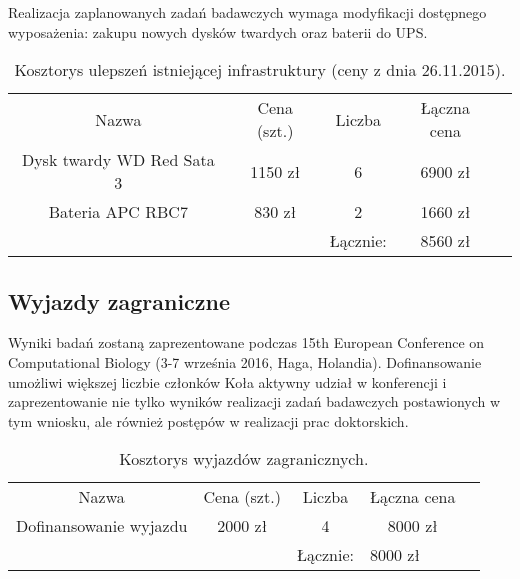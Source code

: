\documentclass{article}
\begin{document}
Realizacja zaplanowanych zadań badawczych wymaga modyfikacji dostępnego wyposażenia: zakupu nowych dysków twardych oraz baterii do UPS.

\begin{table}[!htbp]
\centering
\caption*{Kosztorys ulepszeń istniejącej infrastruktury (ceny z dnia 26.11.2015).}
\begin{tabular}{ccccc}
\cline{1-4}
\multicolumn{1}{|c|}{Nazwa}                     & \multicolumn{1}{c|}{Cena (szt.)} & \multicolumn{1}{c|}{Liczba} & \multicolumn{1}{c|}{Łączna cena} &  \\ \cline{1-4}
\multicolumn{1}{|c|}{Dysk twardy WD Red Sata 3} & \multicolumn{1}{c|}{1150 zł}     & \multicolumn{1}{c|}{6}      & \multicolumn{1}{c|}{6900 zł}     &  \\ \cline{1-4}
\multicolumn{1}{|c|}{Bateria APC RBC7}          & \multicolumn{1}{c|}{830 zł}      & \multicolumn{1}{c|}{2}      & \multicolumn{1}{c|}{1660 zł}     &  \\ \cline{1-4}
                                                &                                  & Łącznie:                    & 8560 zł                          & 
\end{tabular}
\end{table}

\subsection{Wyjazdy zagraniczne}

Wyniki badań zostaną zaprezentowane podczas 15th European Conference on Computational Biology (3-7 września 2016, Haga, Holandia). Dofinansowanie umożliwi większej liczbie członków Koła aktywny udział w konferencji i zaprezentowanie nie tylko wyników realizacji zadań badawczych postawionych w tym wniosku, ale również postępów w realizacji prac doktorskich.

\begin{table}[!htbp]
\centering
\caption*{Kosztorys wyjazdów zagranicznych.}
\begin{tabular}{lllll}
\cline{1-4}
\multicolumn{1}{|c|}{Nazwa}                     & \multicolumn{1}{c|}{Cena (szt.)} & \multicolumn{1}{c|}{Liczba} & \multicolumn{1}{c|}{Łączna cena} &  \\ \cline{1-4}
\multicolumn{1}{|c|}{Dofinansowanie wyjazdu} & \multicolumn{1}{c|}{2000 zł}     & \multicolumn{1}{c|}{4}      & \multicolumn{1}{c|}{8000 zł}     &  \\ \cline{1-4}
                                                &                                  & Łącznie:                    & 8000 zł                          & 
\end{tabular}
\end{table}
\end{document}
